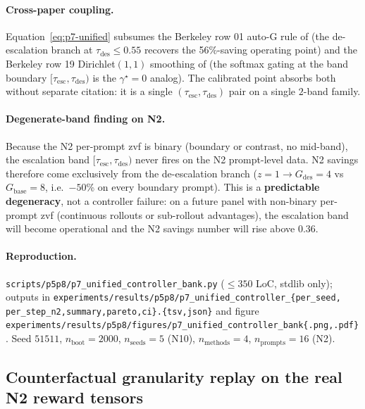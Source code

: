 \paragraph{Cross-paper coupling.}
Equation~\eqref{eq:p7-unified} subsumes the Berkeley row 01
auto-G rule of \citet{su2024dualformer} (the de-escalation branch
at $\tau_{\mathrm{des}}\le 0.55$ recovers the 56\%-saving operating
point) and the Berkeley row 19 Dirichlet$(1,1)$ smoothing of
\citet{alphaproof2025nature} (the softmax gating at the band
boundary $[\tau_{\mathrm{esc}}, \tau_{\mathrm{des}})$ is the
$\gamma^\star{=}0$ analog). The calibrated point absorbs both
without separate citation: it is a single $(\tau_{\mathrm{esc}},
\tau_{\mathrm{des}})$ pair on a single $2$-band family.

\paragraph{Degenerate-band finding on N2.}
Because the N2 per-prompt zvf is binary (boundary or contrast,
no mid-band), the escalation band
$[\tau_{\mathrm{esc}}, \tau_{\mathrm{des}})$ never fires on the
N2 prompt-level data. N2 savings therefore come exclusively from
the de-escalation branch ($z{=}1 \to G_{\mathrm{des}}{=}4$ vs
$G_{\mathrm{base}}{=}8$, i.e.\ $-50$\% on every boundary prompt).
This is a \textbf{predictable degeneracy}, not a controller failure:
on a future panel with non-binary per-prompt zvf
(continuous rollouts or sub-rollout advantages), the
escalation band will become operational and the N2 savings number
will rise above $0.36$.

\paragraph{Reproduction.}
\texttt{scripts/p5p8/p7\_unified\_controller\_bank.py}
($\leq 350$ LoC, stdlib only); outputs in
\texttt{experiments/results/p5p8/p7\_unified\_controller\_\{per\_seed,
per\_step\_n2,summary,pareto,ci\}.\{tsv,json\}} and figure
\texttt{experiments/results/p5p8/figures/p7\_unified\_controller\_bank\{.png,.pdf\}}.
Seed $51511$, $n_{\mathrm{boot}}{=}2000$, $n_{\mathrm{seeds}}{=}5$
(N10), $n_{\mathrm{methods}}{=}4$, $n_{\mathrm{prompts}}{=}16$ (N2).

\subsection{Counterfactual granularity replay on the real N2 reward tensors}
\label{sec:p7-cf-granularity}

